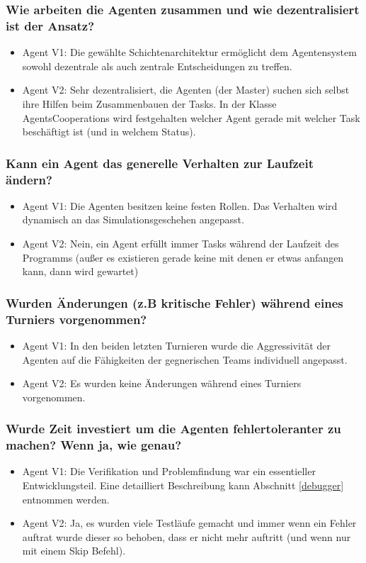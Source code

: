 \documentclass[runningheads]{llncs}
\begin{document}
\subsubsection{Wie arbeiten die Agenten zusammen und wie dezentralisiert ist der Ansatz?}
\begin{itemize}
\item Agent V1: Die gewählte Schichtenarchitektur ermöglicht dem Agentensystem sowohl dezentrale als auch zentrale Entscheidungen zu treffen.
\item Agent V2: Sehr dezentralisiert, die Agenten (der Master) suchen sich selbst ihre Hilfen beim Zusammenbauen der Tasks. In der Klasse AgentsCooperations wird festgehalten welcher Agent gerade mit welcher Task beschäftigt ist (und in welchem Status).
\end{itemize}

\subsubsection{Kann ein Agent das generelle Verhalten zur Laufzeit ändern?}
\begin{itemize}
\item Agent V1: Die Agenten besitzen keine festen Rollen. Das Verhalten wird dynamisch an das Simulationsgeschehen angepasst.
\item Agent V2: Nein, ein Agent erfüllt immer Tasks während der Laufzeit des Programms (außer es existieren gerade keine mit denen er etwas anfangen kann, dann wird gewartet)
\end{itemize}

\subsubsection{Wurden Änderungen (z.B kritische Fehler) während eines Turniers vorgenommen?}
\begin{itemize}
\item Agent V1: In den beiden letzten Turnieren wurde die Aggressivität der Agenten auf die Fähigkeiten der gegnerischen Teams individuell angepasst.
\item Agent V2: Es wurden keine Änderungen während eines Turniers vorgenommen.
\end{itemize}

\subsubsection{Wurde Zeit investiert um die Agenten fehlertoleranter zu machen? Wenn ja, wie genau?}
\begin{itemize}
\item Agent V1: Die Verifikation und Problemfindung war ein essentieller Entwicklungsteil. Eine detailliert Beschreibung kann Abschnitt \ref{debugger} entnommen werden.
\item Agent V2: Ja, es wurden viele Testläufe gemacht und immer wenn ein Fehler auftrat wurde dieser so behoben, dass er nicht mehr auftritt (und wenn nur mit einem Skip Befehl).
\end{itemize}
\end{document}
